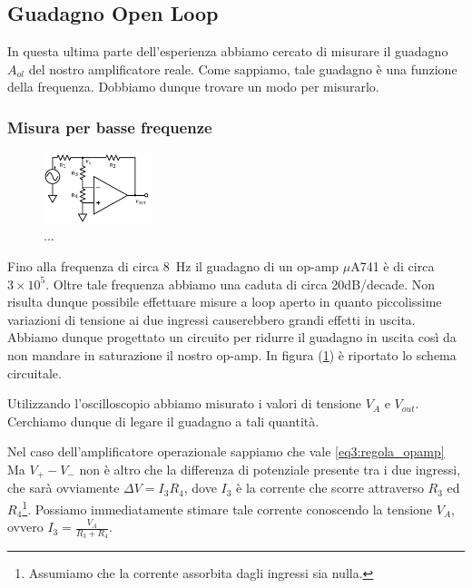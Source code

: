 \subsection{Guadagno Open Loop}

In questa ultima parte dell'esperienza abbiamo cercato di misurare il guadagno $A_{ol}$ del nostro amplificatore reale. Come sappiamo, tale guadagno è una funzione della frequenza. Dobbiamo dunque trovare un modo per misurarlo.

\subsubsection{Misura per basse frequenze}

\begin{figure}
  \begin{center}
    \includegraphics[width=0.280\textwidth]{../E03/latex/LF_ol.pdf}
  \end{center}
  \caption{...}
  \label{cir3:low_frequency}
\end{figure}


Fino alla frequenza di circa \SI{8}{\hertz} il guadagno di un op-amp $\mu$A741 è di circa $3\times 10^5$. Oltre tale frequenza abbiamo una caduta di circa 20dB/decade. Non risulta dunque possibile effettuare misure a loop aperto in quanto piccolissime variazioni di tensione ai due ingressi causerebbero grandi effetti in uscita. Abbiamo dunque progettato un circuito per ridurre il guadagno in uscita così da non mandare in saturazione il nostro op-amp. In figura (\ref{cir3:low_frequency}) è riportato lo schema circuitale.  

Utilizzando l'oscilloscopio abbiamo misurato i valori di tensione $V_A$ e $V_{out}$. Cerchiamo dunque di legare il guadagno a tali quantità.

Nel caso dell'amplificatore operazionale sappiamo che vale \ref{eq3:regola_opamp} Ma $V_+-V_-$ non è altro che la differenza di potenziale presente tra i due ingressi, che sarà ovviamente $\Delta V = I_3R_4$, dove $I_3$ è la corrente che scorre attraverso $R_3$ ed $R_4$\footnote{Assumiamo che la corrente assorbita dagli ingressi sia nulla.}. Possiamo immediatamente stimare tale corrente conoscendo la tensione $V_A$, ovvero $I_3=\frac{V_A}{R_3+R_4}$. 

